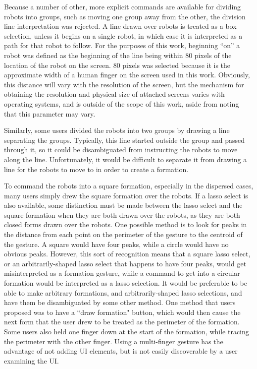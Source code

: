 Because a number of other, more explicit commands are available for dividing robots into groups, such as moving one group away from the other, the division line interpretation was rejected. 
A line drawn over robots is treated as a box selection, unless it begins on a single robot, in which case it is interpreted as a path for that robot to follow. 
For the purposes of this work, beginning ``on'' a robot was defined as the beginning of the line being within 80 pixels of the location of the robot on the screen. 
80 pixels was selected because it is the approximate width of a human finger on the screen used in this work. 
Obviously, this distance will vary with the resolution of the screen, but the mechanism for obtaining the resolution and physical size of attached screens varies with operating systems, and is outside of the scope of this work, aside from noting that this parameter may vary.

Similarly, some users divided the robots into two groups by drawing a line separating the groups.
Typically, this line started outside the group and passed through it, so it could be disambiguated from instructing the robots to move along the line.
Unfortunately, it would be difficult to separate it from drawing a line for the robots to move to in order to create a formation.

To command the robots into a square formation, especially in the dispersed cases, many users simply drew the square formation over the robots.
If a lasso select is also available, some distinction must be made between the lasso select and the square formation when they are both drawn over the robots, as they are both closed forms drawn over the robots.
One possible method is to look for peaks in the distance from each point on the perimeter of the gesture to the centroid of the gesture. 
A square would have four peaks, while a circle would have no obvious peaks. 
However, this sort of recognition means that a square lasso select, or an arbitrarily-shaped lasso select that happens to have four peaks, would get misinterpreted as a formation gesture, while a command to get into a circular formation would be interpreted as a lasso selection. 
It would be preferable to be able to make arbitrary formations, and arbitrarily-shaped lasso selections, and have them be disambiguated by some other method. 
One method that users proposed was to have a ``draw formation" button, which would then cause the next form that the user drew to be treated as the perimeter of the formation. 
Some users also held one finger down at the start of the formation, while tracing the perimeter with the other finger. 
Using a multi-finger gesture has the advantage of not adding UI elements, but is not easily discoverable by a user examining the UI. 

